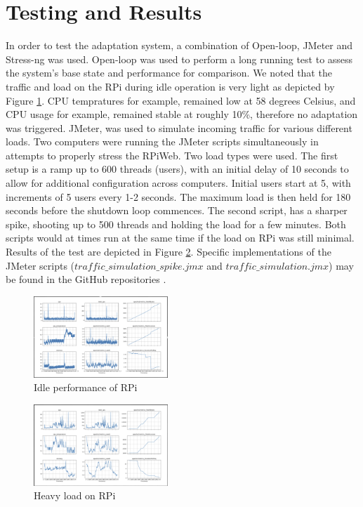 \documentclass[conference]{IEEEtran}
\begin{document}
\section{\textbf{Testing and Results}}\label{test_and_results}
In order to test the adaptation system, a combination of Open-loop, JMeter and Stress-ng was used. Open-loop was used to perform a long running test to assess the system's base state and performance for comparison. We noted that the traffic and load on the RPi during idle operation is very light as depicted by Figure \ref{fig:idle_graphs}. CPU tempratures for example, remained low at 58 degrees Celsius, and CPU usage for example, remained stable at roughly 10\%, therefore no adaptation was triggered. JMeter, was used to simulate incoming traffic for various different loads. Two computers were running the JMeter scripts simultaneously in attempts to properly stress the RPiWeb. Two load types were used. The first setup is a ramp up to 600 threads (users), with an initial delay of 10 seconds to allow for additional configuration across computers. Initial users start at 5, with increments of 5 users every 1-2 seconds. The maximum load is then held for 180 seconds before the shutdown loop commences. The second script, has a sharper spike, shooting up to 500 threads and holding the load for a few minutes. Both scripts would at times run at the same time if the load on RPi was still minimal. Results of the test are depicted in Figure \ref{fig:heavy_load}. Specific implementations of the JMeter scripts ($traffic\_simulation\_spike.jmx$ and $traffic\_simulation.jmx$) may be found in the GitHub repositories \cite{arthur_github}.

\begin{figure}[H]
    \centering
    \includegraphics[width=0.45\textwidth]{./media/idle_graphs.png}
    \caption{Idle performance of RPi}
    \label{fig:idle_graphs}
\end{figure}

\begin{figure}[H]
    \centering
    \includegraphics[width=0.45\textwidth]{./media/heavy_load.png}
    \caption{Heavy load on RPi}
    \label{fig:heavy_load}
\end{figure}
\end{document}
